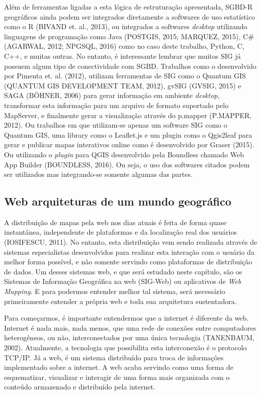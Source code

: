 		Além de ferramentas ligadas a esta lógica de estruturação apresentada, SGBD-R geográficos ainda podem ser integrados diretamente a softwares de uso estatístico como o R (BIVAND et. al., 2013)\cite{BIVAND_etal13}, ou integrados a softwares \textit{desktop} utilizando linguagens de programação como Java (POSTGIS, 2015\cite{POSTGIS}; MARQUEZ, 2015\cite{MARQUEZ}), C\# (AGARWAL, 2012\cite{AGARWAL}; NPGSQL, 2016\cite{NPGSQL}) como no caso deste trabalho, Python, C, C++, e muitas outras. No entanto, é interessante lembrar que muitos SIG já possuem algum tipo de conectividade com SGBD. Trabalhos como o desenvolvido por Pimenta et. al. (2012), utilizam ferramentas de SIG como o Quantum GIS (QUANTUM GIS DEVELOPMENT TEAM, 2012)\cite{QGIS}, gvSIG (GVSIG, 2015)\cite{GVSIG} e SAGA (BÖHNER, 2006)\cite{BOHNER_etal06} para gerar informação em ambiente \textit{desktop}, transformar esta informação para um arquivo de formato suportado pelo MapServer, e finalmente gerar a visualização através do p.mapper (P.MAPPER, 2012)\cite{PMAPPER}. Ou trabalhos em que utilizam-se apenas um software SIG como o Quantum GIS, uma library como o Leaflet.js e um plugin como o Qgis2leaf para gerar e publicar mapas interativos online como é desenvolvido por Graser (2015)\cite{GRASER}. Ou utilizando o \textit{plugin} para QGIS desenvolvido pela Boundless chamado Web App Builder (BOUNDLESS, 2016). Ou seja, o uso dos softwares citados podem ser utilizados mas integrando-se somente algumas das partes.
		
		\subsection{Web arquiteturas de um mundo geográfico}
		
		A distribuição de mapas pela web nos dias atuais é feita de forma quase instantânea, independente de plataformas e da localização real dos usuários (IOSIFESCU, 2011)\cite{IOSIFESCU_11}. No entanto, esta distribuição vem sendo realizada através de sistemas especialistas desenvolvidos para realizar esta interação com o usuário da melhor forma possível, e não somente servindo como plataformas de distribuição de dados. Um desses sistemas web, e que será estudado neste capítulo, são os Sistemas de Informação Geográfica na web (SIG-Web) ou aplicativos de \textit{Web Mapping}. E para podermos entender melhor tal sistema, será necessário primeiramente entender a própria web e toda sua arquitetura sustentadora.
		
		Para começarmos, é importante entendermos que a internet é diferente da web. Internet é nada mais, nada menos, que uma rede de conexões entre computadores heterogêneos, ou não, interconectados por uma única tecnologia (TANENBAUM, 2002)\cite{TANENBAUM_02}. Atualmente, a tecnologia que possibilita esta interconexão é o protocolo TCP/IP. Já a web, é um sistema distribuído para troca de informações implementado sobre a internet. A web acaba servindo como uma forma de esquematizar, visualizar e interagir de uma forma mais organizada com o conteúdo armazenado e distribuído pela internet.
		
